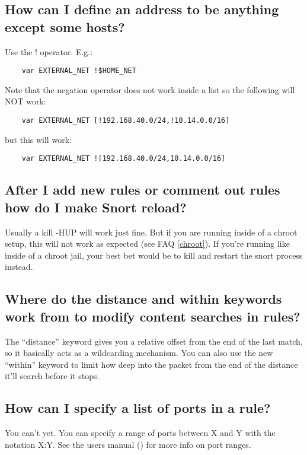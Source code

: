 \documentclass{article}
\newcommand{\myref}[1]{(see FAQ \ref{#1})}
\begin{document}
\subsection{How can I define an address to be anything except some hosts?}

Use the ! operator. E.g.:

\begin{verbatim}
    var EXTERNAL_NET !$HOME_NET
\end{verbatim}
Note that the negation operator does not work inside a list so the following
will NOT work:
\begin{verbatim}
    var EXTERNAL_NET [!192.168.40.0/24,!10.14.0.0/16]
\end{verbatim}
but this will work:
\begin{verbatim}
    var EXTERNAL_NET ![192.168.40.0/24,10.14.0.0/16]
\end{verbatim}
\subsection{After I add new rules or comment out rules how do I make Snort reload?}

Usually a kill -HUP will work just fine. But if you are running inside of a
chroot setup, this will not work as expected \myref{chroot}. If you're running
like inside of a chroot jail, your best bet would be to kill and restart the
snort process instead.

\subsection{Where do the distance and within keywords work from to modify content
searches in rules?}

The ``distance'' keyword gives you a relative offset from the end of the last
match, so it basically acts as a wildcarding mechanism. You can also use the
new ``within'' keyword to limit how deep into the packet from the end of the
distance it'll search before it stops.

\subsection{How can I specify a list of ports in a rule?}

You can't yet. You can specify a range of ports between X and Y with the
notation X:Y. See the users manual () for more info on port ranges.
\end{document}
